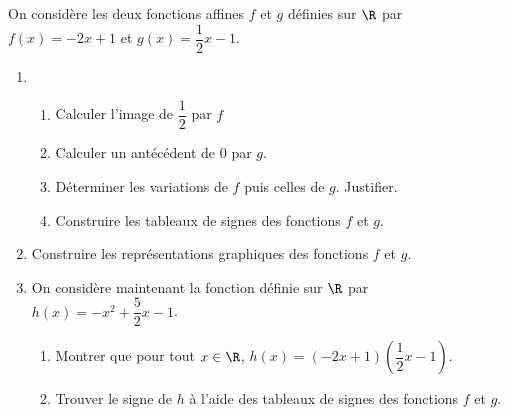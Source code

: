 \documentclass[a4paper]{article}
\begin{document}
  \begin{exercice}{}{}
    On considère les deux fonctions affines $f$ et $g$ définies sur $\R$ par $f(x)=-2x+1$ et $g(x)=\dfrac{1}{2}x-1$.
  
    \begin{enumerate}
      \item \begin{enumerate}
        \item Calculer l'image de $\dfrac{1}{2}$ par $f$
        \item Calculer un antécédent de $0$ par $g$.
        \item Déterminer les variations de $f$ puis celles de $g$. Justifier.
        \item Construire les tableaux de signes des fonctions $f$ et $g$.
      \end{enumerate}
  
      \item Construire les représentations graphiques des fonctions $f$ et $g$.

      \item On considère maintenant la fonction définie sur $\R$ par $h(x)=-x^2+\dfrac{5}{2}x-1$.
      \begin{enumerate}
        \item Montrer que pour tout $x\in \R$, $h(x)=(-2x+1)(\dfrac{1}{2}x-1)$.
        \item Trouver le signe de $h$ à l'aide des tableaux de signes des fonctions $f$ et $g$.
      \end{enumerate} 
    \end{enumerate}
  \end{exercice}
  
  \medskip
\end{document}
